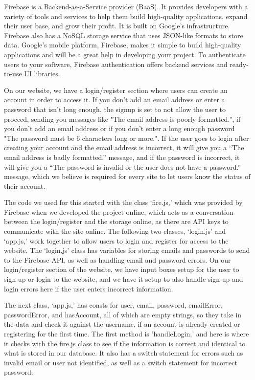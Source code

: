Firebase is a Backend-as-a-Service provider (BaaS). It provides developers with a variety of tools and services to help them build high-quality applications, expand their user base, and grow their profit. It is built on Google's infrastructure. Firebase also has a NoSQL storage service that uses JSON-like formats to store data. Google's mobile platform, Firebase, makes it simple to build high-quality applications and will be a great help in developing your project. To authenticate users to your software, Firebase authentication offers backend services and ready-to-use UI libraries.\hfill \break

On our website, we have a login/register section where users can create an account in order to access it. If you don't add an email address or enter a password that isn't long enough, the signup is set to not allow the user to proceed, sending you messages like "The email address is poorly formatted.", if you don't add an email address or if you don't enter a long enough password "The password must be 6 characters long or more.". If the user goes to login after creating your account and the email address is incorrect, it will give you a “The email address is badly formatted.” message, and if the password is incorrect, it will give you a “The password is invalid or the user does not have a password.” message, which we believe is required for every site to let users know the status of their account.\hfill \break

The code we used for this started with the class ‘fire.js,' which was provided by Firebase when we developed the project online, which acts as a conversation between the login/register and the storage online, as there are API keys to communicate with the site online. The following two classes, ‘login.js' and ‘app.js,' work together to allow users to login and register for access to the website. The ‘login.js' class has variables for storing emails and passwords to send to the Firebase API\cite{ref27}, as well as handling email and password errors. On our login/register section of the website, we have input boxes setup for the user to sign up or login to the website, and we have it setup to also handle sign-up and login errors here if the user enters incorrect information.\hfill \break

The next class, ‘app.js,' has consts for user, email, password, emailError, passwordError, and hasAccount, all of which are empty strings, so they take in the data and check it against the username, if an account is already created or registering for the first time. The first method is 'handleLogin,' and here is where it checks with the fire.js class to see if the information is correct and identical to what is stored in our database. It also has a switch statement for errors such as invalid email or user not identified, as well as a switch statement for incorrect password.\hfill \break

